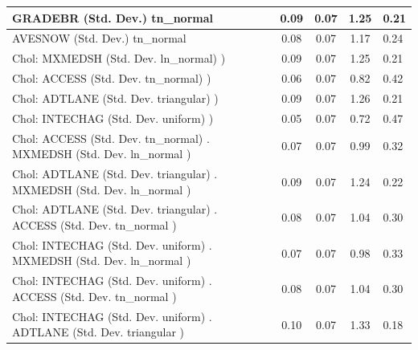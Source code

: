 \begin{table}
\begin{center}
\begin{tabular}{|l|l|c|c|c|l|}
			\hline
			GRADEBR (Std. Dev.) tn_normal &  & 0.09 & 0.07 & 1.25 & 0.21 \\
			\hline
			AVESNOW (Std. Dev.) tn_normal &  & 0.08 & 0.07 & 1.17 & 0.24 \\
			\hline
			 Chol: MXMEDSH (Std. Dev. ln_normal) ) &  & 0.09 & 0.07 & 1.25 & 0.21 \\
			\hline
			 Chol: ACCESS (Std. Dev. tn_normal) ) &  & 0.06 & 0.07 & 0.82 & 0.42 \\
			\hline
			 Chol: ADTLANE (Std. Dev. triangular) ) &  & 0.09 & 0.07 & 1.26 & 0.21 \\
			\hline
			 Chol: INTECHAG (Std. Dev. uniform) ) &  & 0.05 & 0.07 & 0.72 & 0.47 \\
			\hline
			 Chol: ACCESS (Std. Dev. tn_normal) . MXMEDSH (Std. Dev.   ln_normal ) &  & 0.07 & 0.07 & 0.99 & 0.32 \\
			\hline
			 Chol: ADTLANE (Std. Dev. triangular) . MXMEDSH (Std. Dev.   ln_normal ) &  & 0.09 & 0.07 & 1.24 & 0.22 \\
			\hline
			 Chol: ADTLANE (Std. Dev. triangular) . ACCESS (Std. Dev.   tn_normal ) &  & 0.08 & 0.07 & 1.04 & 0.30 \\
			\hline
			 Chol: INTECHAG (Std. Dev. uniform) . MXMEDSH (Std. Dev.   ln_normal ) &  & 0.07 & 0.07 & 0.98 & 0.33 \\
			\hline
			 Chol: INTECHAG (Std. Dev. uniform) . ACCESS (Std. Dev.   tn_normal ) &  & 0.08 & 0.07 & 1.04 & 0.30 \\
			\hline
			 Chol: INTECHAG (Std. Dev. uniform) . ADTLANE (Std. Dev.   triangular ) &  & 0.10 & 0.07 & 1.33 & 0.18 \\
			\hline
		\end{tabular}
	\end{center}
\end{table}